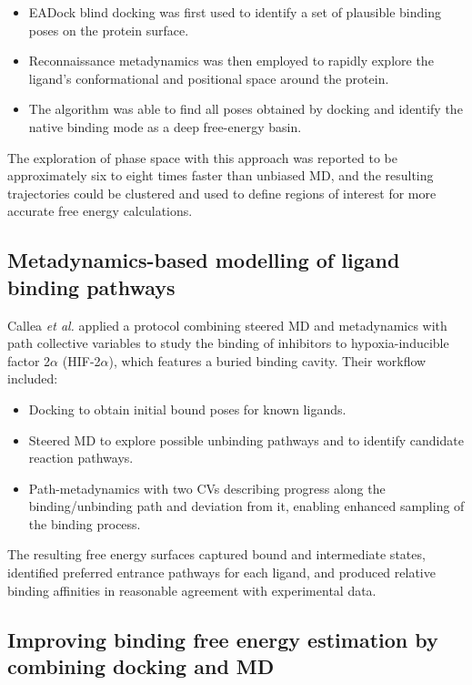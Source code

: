 \documentclass[12pt]{article}
\begin{document}
\begin{itemize}
\item EADock\cite{CH9_grosdidier2007eadock} blind docking was first used to identify a set of plausible binding poses on the protein surface.
\item Reconnaissance metadynamics was then employed to rapidly explore the ligand's conformational and positional space around the protein.
\item The algorithm was able to find all poses obtained by docking and identify the native binding mode as a deep free-energy basin.
\end{itemize}

The exploration of phase space with this approach was reported to be approximately six to eight times faster than unbiased MD, and the resulting trajectories could be clustered and used to define regions of interest for more accurate free energy calculations\cite{CH9_soderhjelm2012}. 

\subsection{Metadynamics-based modelling of ligand binding pathways}

Callea \emph{et al.}\cite{CH9_Callea2021} applied a protocol combining steered MD and metadynamics with path collective variables to study the binding of inhibitors to hypoxia-inducible factor 2$\alpha$ (HIF-2$\alpha$), which features a buried binding cavity. Their workflow included:

\begin{itemize}
\item Docking to obtain initial bound poses for known ligands.
\item Steered MD to explore possible unbinding pathways and to identify candidate reaction pathways.
\item Path-metadynamics with two CVs describing progress along the binding/unbinding path and deviation from it, enabling enhanced sampling of the binding process.
\end{itemize}

The resulting free energy surfaces captured bound and intermediate states, identified preferred entrance pathways for each ligand, and produced relative binding affinities in reasonable agreement with experimental data.

\subsection{Improving binding free energy estimation by combining docking and MD}
\end{document}

